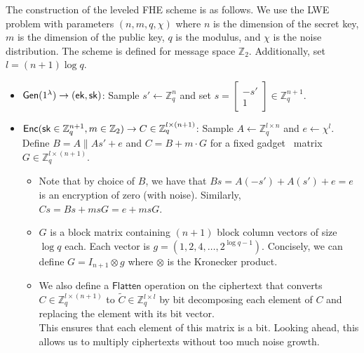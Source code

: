 The construction of the leveled FHE scheme is as follows. We use the LWE problem with parameters $(n, m, q, \chi)$ where $n$ is the dimension of the secret key, $m$ is the dimension of the public key, $q$ is the modulus, and $\chi$ is the noise distribution. The scheme is defined for message space $\mathbb{Z}_2$. Additionally, set $l = (n+1) \log q$.
\begin{itemize}
    \item $\mathsf{Gen}(1^\lambda) \rightarrow (\mathsf{ek}, \mathsf{sk})$: Sample $s' \gets \mathbb{Z}_q^{n}$ and set $s =  
    \begin{bmatrix}
        -s' \\
        1
    \end{bmatrix} \in \mathbb{Z}_q^{n+1}$. 

    \item $\mathsf{Enc}(\mathsf{sk} \in \mathbb{Z}_q^{n+1}, m \in \mathbb{Z}_2) \rightarrow C \in \mathbb{Z}_q^{l \times (n+1)}$: Sample $A \gets \mathbb{Z}_q^{l \times n}$ and $e \gets \chi^{l}$. Define $B = A \| As' + e$ and $C = B + m \cdot G$ for a fixed gadget~\cite{EC:MicPei12} matrix $G \in \mathbb{Z}_q^{l \times (n+1)}$.
    
    \begin{itemize}
        \item Note that by choice of $B$, we have that $Bs = A(-s') + A(s') + e = e$ is an encryption of zero (with noise). Similarly, $Cs = Bs + msG = e + msG$. 
        \item $G$ is a block matrix containing $(n+1)$ block column vectors of size $\log q$ each. Each vector is $g = (1, 2, 4, \ldots, 2^{\log q - 1})$. Concisely, we can define $G = I_{n+1} \otimes g$ where $\otimes$ is the Kronecker product.
        \item We also define a $\mathsf{Flatten}$ operation on the ciphertext that converts $C \in \mathbb{Z}_q^{l \times (n+1)}$ to $\tilde{C} \in \mathbb{Z}_q^{l \times l}$ by bit decomposing each element of $C$ and replacing the element with its bit vector. \\
        This ensures that each element of this matrix is a bit. Looking ahead, this allows us to multiply ciphertexts without too much noise growth.
    \end{itemize}
    
\end{itemize}
